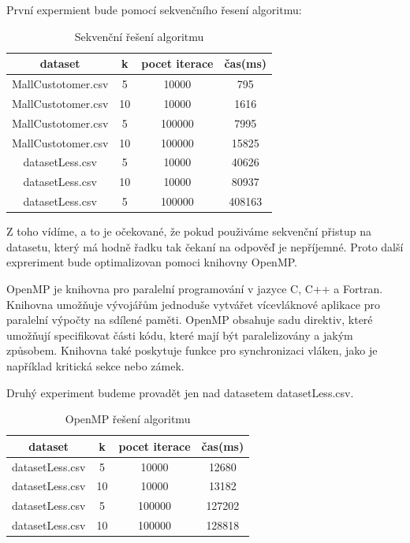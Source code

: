 \documentclass[czech,bachelor]{seminarka}
\begin{document}
První expermient bude pomocí sekvenčního řesení algoritmu:
\begin{table}[htbp]
\centering
\label{tab:sequence}
\begin{tabular}{ |c|c|c|c| } 
 \hline
 dataset & k & pocet iterace & čas(ms) \\ 
 \hline
 MallCustotomer.csv & 5 & 10000 & 795 \\ 
 MallCustotomer.csv & 10 & 10000 & 1616 \\
 MallCustotomer.csv & 5 & 100000 & 7995 \\
 MallCustotomer.csv & 10 & 100000 & 15825 \\
 datasetLess.csv & 5 & 10000 & 40626 \\
 datasetLess.csv & 10 & 10000 & 80937 \\
 datasetLess.csv & 5 & 100000 & 408163 \\  
 \hline
\end{tabular}
\caption{Sekvenční řešení algoritmu}
\end{table}

Z toho vídíme, a to je očekované, že pokud použiváme sekvenční přistup na datasetu, který má hodně řadku tak čekaní na odpověď je nepříjemné. Proto další expreriment bude optimalizovan pomoci knihovny OpenMP.

OpenMP je knihovna pro paralelní programování v jazyce C, C++ a Fortran. Knihovna umožňuje vývojářům jednoduše vytvářet vícevláknové aplikace pro paralelní výpočty na sdílené paměti. OpenMP obsahuje sadu direktiv, které umožňují specifikovat části kódu, které mají být paralelizovány a jakým způsobem. Knihovna také poskytuje funkce pro synchronizaci vláken, jako je například kritická sekce nebo zámek.

Druhý experiment budeme provadět jen nad datasetem datasetLess.csv.
\begin{table}[htbp]
\centering
\label{tab:sequence}
\begin{tabular}{ |c|c|c|c| } 
 \hline
 dataset & k & pocet iterace & čas(ms) \\ 
 \hline
 datasetLess.csv & 5 & 10000 & 12680 \\
 datasetLess.csv & 10 & 10000 & 13182 \\
 datasetLess.csv & 5 & 100000 & 127202 \\  
 datasetLess.csv & 10 & 100000 & 128818 \\  
 \hline
\end{tabular}
\caption{OpenMP řešení algoritmu}
\end{table}
\end{document}
